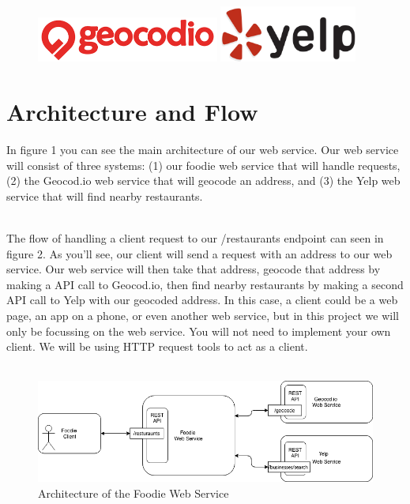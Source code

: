 \documentclass{article}
\begin{document}
\begin{figure}[h!]
 \centering
 \includegraphics[width=60mm]{images/geocodio}
 \hspace{1cm}
 \includegraphics[width=45mm]{images/YelpLogo}
\end{figure} 

\section*{Architecture and Flow}
In figure 1 you can see the main architecture of our web service. Our web service will consist of three systems: (1) our foodie web service that will handle requests, (2) the Geocod.io web service that will geocode an address, and (3) the Yelp web service that will find nearby restaurants.


\-\ \\
The flow of handling a client request to our /restaurants endpoint can seen in figure 2. As you'll see, our client will send a request with an address to our web service. Our web service will then take that address, geocode that address by making a API call to Geocod.io, then find nearby restaurants by making a second API call to Yelp with our geocoded address. In this case, a client could be a web page, an app on a phone, or even another web service, but in this project we will only be focussing on the web service. You will not need to implement your own client. We will be using HTTP request tools to act as a client.  \\\\

\begin{figure}[h!]
    \includegraphics[width=\linewidth]{images/architecture-2}
    \caption{Architecture of the Foodie Web Service}
\end{figure}
\end{document}

